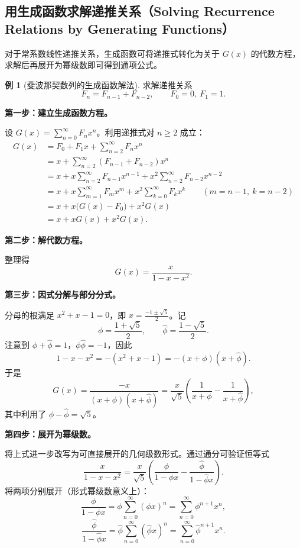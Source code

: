 \documentclass[UTF8,11pt,a4paper]{ctexbook}   %
\theoremstyle{definition}
\newtheorem{example}{例}[section]
\begin{document}
\subsection{用生成函数求解递推关系（Solving Recurrence Relations by Generating Functions）}

对于常系数线性递推关系，生成函数可将递推式转化为关于 $G(x)$ 的代数方程，求解后再展开为幂级数即可得到通项公式。

\begin{example}[斐波那契数列的生成函数解法]\label{ex:gf-fibonacci}
求解递推关系
\[
F_n = F_{n-1}+F_{n-2},\qquad F_0=0,\ F_1=1.
\]

\textbf{第一步：建立生成函数方程。}

设 $\displaystyle G(x)=\sum_{n=0}^{\infty}F_n x^n$。利用递推式对 $n\ge 2$ 成立：
\begin{align*}
G(x) &= F_0+F_1x+\sum_{n=2}^{\infty}F_n x^n \\
&= x + \sum_{n=2}^{\infty}(F_{n-1}+F_{n-2})x^n \\
&= x + x\sum_{n=2}^{\infty}F_{n-1}x^{n-1} + x^2\sum_{n=2}^{\infty}F_{n-2}x^{n-2} \\
&= x + x\sum_{m=1}^{\infty}F_m x^m + x^2\sum_{k=0}^{\infty}F_k x^k \qquad(m=n-1,\ k=n-2)\\
&= x + x\bigl(G(x)-F_0\bigr) + x^2 G(x) \\
&= x + xG(x) + x^2G(x).
\end{align*}

\textbf{第二步：解代数方程。}

整理得
\[
G(x) = \frac{x}{1-x-x^2}.
\]

\textbf{第三步：因式分解与部分分式。}

分母的根满足 $x^2+x-1=0$，即 $x=\frac{-1\pm\sqrt{5}}{2}$。记
\[
\phi=\frac{1+\sqrt{5}}{2},\qquad \hat{\phi}=\frac{1-\sqrt{5}}{2}.
\]
注意到 $\phi+\hat{\phi}=1$，$\phi\hat{\phi}=-1$，因此
\[
1-x-x^2 = -(x^2+x-1) = -(x+\phi)(x+\hat{\phi}).
\]
于是
\[
G(x) = \frac{-x}{(x+\phi)(x+\hat{\phi})}
= \frac{x}{\sqrt{5}}\left(\frac{1}{x+\phi}-\frac{1}{x+\hat{\phi}}\right),
\]
其中利用了 $\phi-\hat{\phi}=\sqrt{5}$。

\textbf{第四步：展开为幂级数。}

将上式进一步改写为可直接展开的几何级数形式。通过通分可验证恒等式
\[
\frac{x}{1-x-x^2} = \frac{x}{\sqrt{5}}\left(\frac{\phi}{1-\phi x} - \frac{\hat{\phi}}{1-\hat{\phi} x}\right).
\]
将两项分别展开（形式幂级数意义上）：
\[
\frac{\phi}{1-\phi x} = \phi\sum_{n=0}^{\infty}(\phi x)^n = \sum_{n=0}^{\infty}\phi^{n+1}x^n,
\]
\[
\frac{\hat{\phi}}{1-\hat{\phi} x} = \hat{\phi}\sum_{n=0}^{\infty}(\hat{\phi} x)^n = \sum_{n=0}^{\infty}\hat{\phi}^{n+1}x^n.
\]


\end{example}
\end{document}
